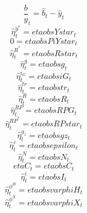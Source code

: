 \begin{dmath}
{\frac{b}{y}_{t}}={\hat{b}_{t}}-{\hat{y}_{t}}
\end{dmath}
\begin{dmath}
{\hat{\eta}^{y^*}_{t}}={etaobsYstar_{t}}
\end{dmath}
\begin{dmath}
0={etaobsPiYstar_{t}}
\end{dmath}
\begin{dmath}
{\hat{\eta}^{R^*}_{t}}={etaobsRstar_{t}}
\end{dmath}
\begin{dmath}
{\hat{\eta}^{g}_{t}}={etaobsg_{t}}
\end{dmath}
\begin{dmath}
{\hat{\eta}^{i_G}_{t}}={etaobsiG_{t}}
\end{dmath}
\begin{dmath}
{\hat{\eta}^{tr}_{t}}={etaobstr_{t}}
\end{dmath}
\begin{dmath}
{\hat{\eta}^{R}_{t}}={etaobsR_{t}}
\end{dmath}
\begin{dmath}
{\hat{\eta}^{RP}_{t}}={etaobsRPG_{t}}
\end{dmath}
\begin{dmath}
{\hat{\eta}^{RP^*}_{t}}={etaobsRPstar_{t}}
\end{dmath}
\begin{dmath}
{\hat{\eta}^{g_z}_{t}}={etaobsgz_{t}}
\end{dmath}
\begin{dmath}
{\hat{\eta}^{\varepsilon}_{t}}={etaobsepsilon_{t}}
\end{dmath}
\begin{dmath}
{\hat{\eta}^{N}_{t}}={etaobsN_{t}}
\end{dmath}
\begin{dmath}
{etaC_{t}}={etaobsC_{t}}
\end{dmath}
\begin{dmath}
{\hat{\eta}^{i}_{t}}={etaobsI_{t}}
\end{dmath}
\begin{dmath}
{\hat{\eta}^{\phi^H}_{t}}={etaobsvarphiH_{t}}
\end{dmath}
\begin{dmath}
{\hat{\eta}^{\phi^X}_{t}}={etaobsvarphiX_{t}}
\end{dmath}
